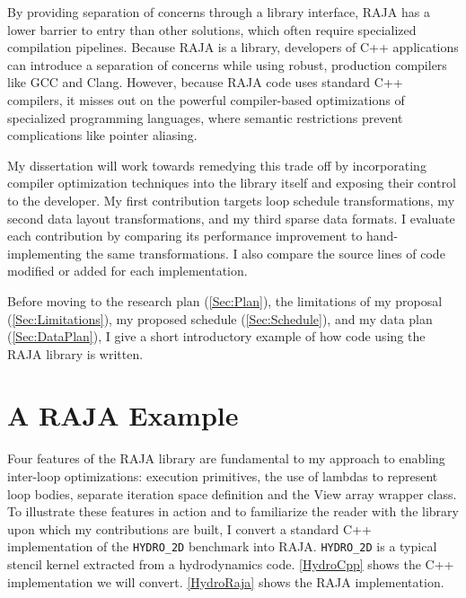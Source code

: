 \documentclass{article}
\begin{document}
By providing separation of concerns through a library interface, RAJA has a lower barrier to entry than other solutions, which often require specialized compilation pipelines. 
Because RAJA is a library, developers of C++ applications can introduce a separation of concerns while using robust, production compilers like GCC and Clang.
However, because RAJA code uses standard C++ compilers, it misses out on the powerful compiler-based optimizations of specialized programming languages, where semantic restrictions prevent complications like pointer aliasing.

My dissertation will work towards remedying this trade off by incorporating compiler optimization techniques into the library itself and exposing their control to the developer. 
My first contribution targets loop schedule transformations, my second data layout transformations, and my third sparse data formats.
I evaluate each contribution by comparing its performance improvement to hand-implementing the same transformations.
I also compare the source lines of code modified or added for each implementation.

Before moving to the research plan (\cref{Sec:Plan}), the limitations of my proposal (\autoref{Sec:Limitations}), my proposed schedule (\autoref{Sec:Schedule}), and my data plan (\autoref{Sec:DataPlan}), I give a short introductory example of how code using the RAJA library is written.

\section{A RAJA Example}

Four features of the RAJA library are fundamental to my approach to enabling inter-loop optimizations: execution primitives, the use of lambdas to represent loop bodies, separate iteration space definition and the View array wrapper class.
To illustrate these features in action and to familiarize the reader with the library upon which my contributions are built, I convert a standard C++ implementation of the \verb.HYDRO_2D. benchmark into RAJA. 
\verb.HYDRO_2D. is a typical stencil kernel extracted from a hydrodynamics code. 
\autoref{HydroCpp} shows the C++ implementation we will convert.
\autoref{HydroRaja} shows the RAJA implementation.
\end{document}
